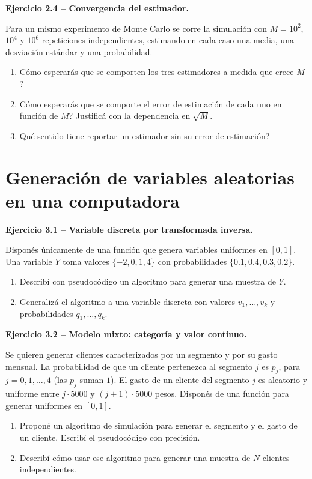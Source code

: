 \documentclass[11pt,a4paper]{article}
\newcommand{\ejercicio}[1]{\par\medskip\noindent\textbf{#1}\par\nopagebreak\smallskip}
\begin{document}
\ejercicio{Ejercicio 2.4 -- Convergencia del estimador.}
Para un mismo experimento de Monte Carlo se corre la simulaci\'on con
$M=10^2$, $10^4$ y $10^6$ repeticiones independientes, estimando en cada caso una
media, una desviaci\'on est\'andar y una probabilidad.
\begin{enumerate}[label=(\alph*)]
  \item \textquestiondown{}C\'omo esperar\'as que se comporten los tres estimadores a medida que crece $M$?
  \item \textquestiondown{}C\'omo esperar\'as que se comporte el error de estimaci\'on de cada uno en
        funci\'on de $M$? Justific\'a con la dependencia en $\sqrt{M}$.
  \item \textquestiondown{}Qu\'e sentido tiene reportar un estimador sin su error de estimaci\'on?
\end{enumerate}

\section{Generaci\'on de variables aleatorias en una computadora}

\ejercicio{Ejercicio 3.1 -- Variable discreta por transformada inversa.}
Dispon\'es \'unicamente de una funci\'on que genera variables uniformes en $[0,1]$.
Una variable $Y$ toma valores $\{-2,0,1,4\}$ con probabilidades
$\{0.1,0.4,0.3,0.2\}$.
\begin{enumerate}[label=(\alph*)]
  \item Describ\'i con pseudoc\'odigo un algoritmo para generar una muestra de $Y$.
  \item Generaliz\'a el algoritmo a una variable discreta con valores
        $v_1,\dots,v_k$ y probabilidades $q_1,\dots,q_k$.
\end{enumerate}

\ejercicio{Ejercicio 3.2 -- Modelo mixto: categor\'ia y valor continuo.}
Se quieren generar clientes caracterizados por un segmento y por su gasto mensual.
La probabilidad de que un cliente pertenezca al segmento $j$ es $p_j$, para
$j=0,1,\dots,4$ (las $p_j$ suman $1$). El gasto de un cliente del segmento $j$ es
aleatorio y uniforme entre $j\cdot 5000$ y $(j+1)\cdot 5000$ pesos. Dispon\'es de
una funci\'on para generar uniformes en $[0,1]$.
\begin{enumerate}[label=(\alph*)]
  \item Propon\'e un algoritmo de simulaci\'on para generar el segmento y el gasto de
        un cliente. Escrib\'i el pseudoc\'odigo con precisi\'on.
  \item Describ\'i c\'omo usar ese algoritmo para generar una muestra de $N$ clientes
        independientes.
\end{enumerate}
\end{document}
